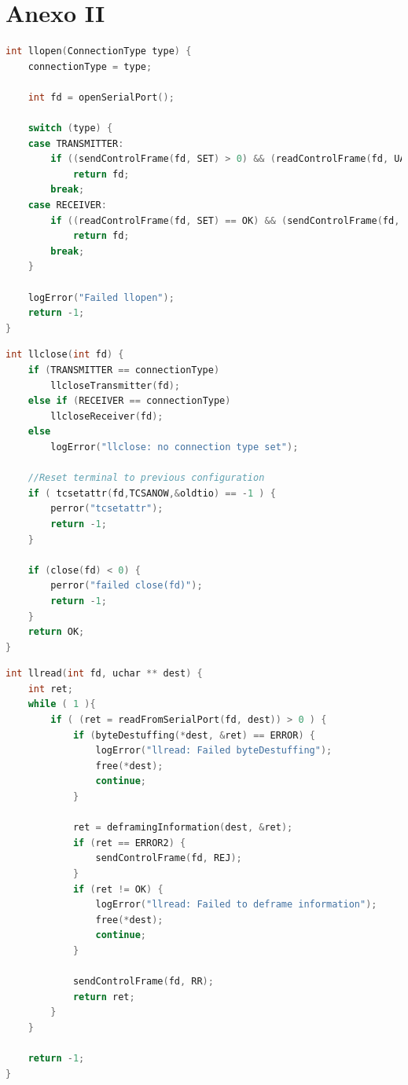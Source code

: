 \documentclass[a4paper, 11pt]{article}
\begin{document}
\section{Anexo II}

\begin{lstlisting}[caption = llopen, language=C]
int llopen(ConnectionType type) {
	connectionType = type;

	int fd = openSerialPort();

	switch (type) {
	case TRANSMITTER:
		if ((sendControlFrame(fd, SET) > 0) && (readControlFrame(fd, UA) == OK))
			return fd;
		break;
	case RECEIVER:
		if ((readControlFrame(fd, SET) == OK) && (sendControlFrame(fd, UA) > 0))
			return fd;
		break;
	}

	logError("Failed llopen");
	return -1;
}
\end{lstlisting}


\begin{lstlisting}[caption = llclose, language=C]
int llclose(int fd) {
	if (TRANSMITTER == connectionType)
		llcloseTransmitter(fd);
	else if (RECEIVER == connectionType)
		llcloseReceiver(fd);
	else
		logError("llclose: no connection type set");

	//Reset terminal to previous configuration
	if ( tcsetattr(fd,TCSANOW,&oldtio) == -1 ) {
		perror("tcsetattr");
		return -1;
	}

	if (close(fd) < 0) {
		perror("failed close(fd)");
		return -1;
	}
	return OK;
}
\end{lstlisting}

\begin{lstlisting}[caption = llread, language=C]
int llread(int fd, uchar ** dest) {
	int ret;
	while ( 1 ){
		if ( (ret = readFromSerialPort(fd, dest)) > 0 ) {
			if (byteDestuffing(*dest, &ret) == ERROR) {
				logError("llread: Failed byteDestuffing");
				free(*dest);
				continue;
			}

			ret = deframingInformation(dest, &ret);
			if (ret == ERROR2) {
				sendControlFrame(fd, REJ);
			}
			if (ret != OK) {
				logError("llread: Failed to deframe information");
				free(*dest);
				continue;
			}

			sendControlFrame(fd, RR);
			return ret;
		}
	}
	
	return -1;
}
\end{lstlisting}
\end{document}
